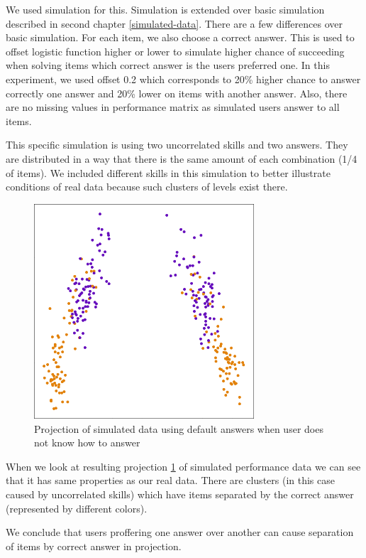 \documentclass[
  digital, %
  table,   %
  nolof,     %
  nolot,     %
  nocover,
  color,
  final, %
]{fithesis3}
\begin{document}
We used simulation for this. Simulation is extended over basic simulation described in second chapter \ref{simulated-data}. There are a few differences over basic simulation. For each item, we also choose a correct answer. This is used to offset logistic function higher or lower to simulate higher chance of succeeding when solving items which correct answer is the users preferred one. In this experiment, we used offset 0.2 which corresponds to 20\% higher chance to answer correctly one answer and 20\% lower on items with another answer. Also, there are no missing values in performance matrix as simulated users answer to all items.

This specific simulation is using two uncorrelated skills and two answers. They are distributed in a way that there is the same amount of each combination (1/4 of items). We included different skills in this simulation to better illustrate conditions of real data because such clusters of levels exist there.

\begin{figure}
  \includegraphics[height=8cm]{img/simulated_default}
  \caption{Projection of simulated data using default answers when user does not know how to answer}
  \label{fig:simulated_default}
\end{figure}

When we look at resulting projection \ref{fig:simulated_default} of simulated performance data we can see that it has same properties as our real data. There are clusters (in this case caused by uncorrelated skills) which have items separated by the correct answer (represented by different colors).

We conclude that users proffering one answer over another can cause separation of items by correct answer in projection.
\end{document}
